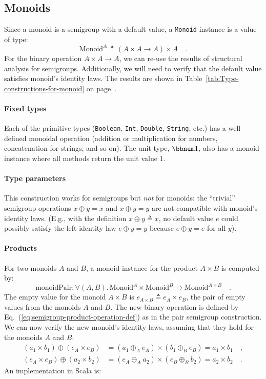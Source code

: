\subsection{Monoids\label{subsec:Monoids-constructions}}

Since a monoid is a semigroup with a default value, a \lstinline!Monoid!
instance is a value of type:
\[
\text{Monoid}^{A}\triangleq\left(A\times A\rightarrow A\right)\times A\quad.
\]
For the binary operation $A\times A\rightarrow A$, we can re-use
the results of structural analysis for semigroups. Additionally, we
will need to verify that the default value satisfies monoid\textsf{'}s identity
laws. The results are shown in Table~\ref{tab:Type-constructions-for-monoid}
on page~\pageref{tab:Type-constructions-for-monoid}.

\paragraph{Fixed types}

Each of the primitive types (\lstinline!Boolean!, \lstinline!Int!,
\lstinline!Double!, \lstinline!String!, etc.) has a well-defined
monoidal operation (addition or multiplication for numbers, concatenation
for strings, and so on). The unit type, $\bbnum 1$, also has a monoid
instance where all methods return the unit value $1$.

\paragraph{Type parameters}

This construction works for semigroups but \emph{not} for monoids:
the \textsf{``}trivial\textsf{''} semigroup operations $x\oplus y=x$ and $x\oplus y=y$
are not compatible with monoid\textsf{'}s identity laws. (E.g., with the definition
$x\oplus y\triangleq x$, no default value $e$ could possibly satisfy
the left identity law $e\oplus y=y$ because $e\oplus y=e$ for all
$y$).

\paragraph{Products}

For two monoids $A$ and $B$, a monoid instance for the product $A\times B$
is computed by:
\[
\text{monoidPair}:\forall(A,B).\,\text{Monoid}^{A}\times\text{Monoid}^{B}\rightarrow\text{Monoid}^{A\times B}\quad.
\]
The empty value for the monoid $A\times B$ is $e_{A\times B}\triangleq e_{A}\times e_{B}$,
the pair of empty values from the monoids $A$ and $B$. The new binary
operation is defined by Eq.~(\ref{eq:semigroup-product-operation-def})
as in the pair semigroup construction. We can now verify the new monoid\textsf{'}s
identity laws, assuming that they hold for the monoids $A$ and $B$:
\begin{align*}
(a_{1}\times b_{1})\oplus(e_{A}\times e_{B}) & =(a_{1}\oplus_{A}e_{A})\times(b_{1}\oplus_{B}e_{B})=a_{1}\times b_{1}\quad,\\
(e_{A}\times e_{B})\oplus(a_{2}\times b_{2}) & =(e_{A}\oplus_{A}a_{2})\times(e_{B}\oplus_{B}b_{2})=a_{2}\times b_{2}\quad.
\end{align*}
An implementation in Scala is:

